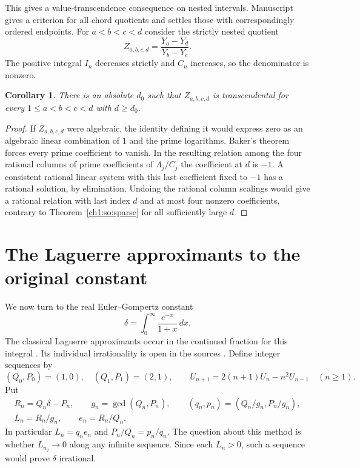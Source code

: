 \documentclass[11pt,a4paper,oneside,openany]{report}
\newtheorem{corollary}[theorem]{Corollary}
\theoremstyle{remark}\newtheorem{remark}[theorem]{Remark}
\numberwithin{equation}{section}
\begin{document}
This gives a value-transcendence consequence on nested intervals. Manuscript \cite{vm170} gives a criterion for all chord quotients and settles those with correspondingly ordered endpoints. For $a<b<c<d$ consider the strictly nested quotient
\[
 Z_{a,b,c,d}=\frac{Y_a-Y_d}{Y_b-Y_c}.
\]
The positive integral $I_n$ decreases strictly and $C_n$ increases, so the denominator is nonzero.
\begin{corollary}\label{ch1:so:nested}
There is an absolute $d_0$ such that $Z_{a,b,c,d}$ is transcendental for every $1\le a<b<c<d$ with $d\ge d_0$.
\end{corollary}
\begin{proof}
If $Z_{a,b,c,d}$ were algebraic, the identity defining it would express zero as an algebraic linear combination of $1$ and the prime logarithms. Baker's theorem forces every prime coefficient to vanish. In the resulting relation among the four rational columns of prime coefficients of $\Lambda_j/C_j$ the coefficient at $d$ is $-1$. A consistent rational linear system with this last coefficient fixed to $-1$ has a rational solution, by elimination. Undoing the rational column scalings would give a rational relation with last index $d$ and at most four nonzero coefficients, contrary to Theorem~\ref{ch1:so:sparse} for all sufficiently large $d$.
\end{proof}

\section{The Laguerre approximants to the original constant}
\label{ch1:sec:gomp-family}

We now turn to the real Euler--Gompertz constant
\[
  \delta=\int_0^\infty\frac{e^{-x}}{1+x}\,dx.
\]
The classical Laguerre approximants occur in the continued fraction for
this integral \cite{lagarias,ems}. Its individual irrationality is open
in the sources \cite{my,ems}. Define integer sequences by
\[
 (Q_0,P_0)=(1,0),\quad (Q_1,P_1)=(2,1),\qquad
 U_{n+1}=2(n+1)U_n-n^2 U_{n-1}\quad(n\ge1).
\]
Put
\[
 \begin{gathered}
 R_n=Q_n\delta-P_n,\qquad g_n=\gcd(Q_n,P_n),\qquad
 (q_n,p_n)=(Q_n/g_n,P_n/g_n),\\
 L_n=R_n/g_n,\qquad e_n=R_n/Q_n .
 \end{gathered}
\]
In particular $L_n=q_n e_n$ and $P_n/Q_n=p_n/q_n$. The question about
this method is whether $L_{n_j}\to0$ along any infinite sequence. Since
each $L_n>0$, such a sequence would prove $\delta$ irrational.
\end{document}
